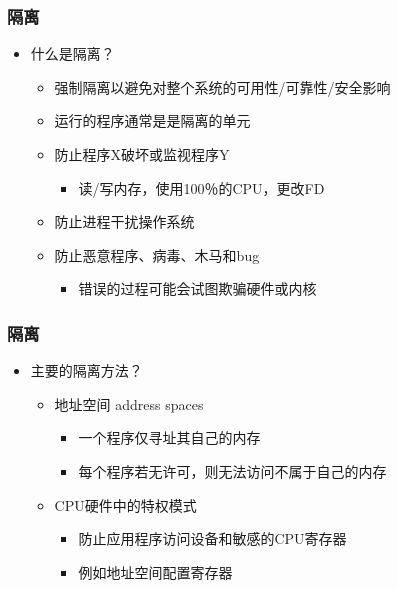 \documentclass[UTF8]{ctexbeamer}
\begin{document}
\begin{frame}
	\frametitle{隔离}
	\begin{itemize}
		\item 什么是隔离？
		\begin{itemize}

		\item 强制隔离以避免对整个系统的可用性/可靠性/安全影响
		\item 运行的程序通常是是隔离的单元
		\item 防止程序X破坏或监视程序Y
			\begin{itemize}
			\item 读/写内存，使用100％的CPU，更改FD
			\end{itemize}
		\item 防止进程干扰操作系统
		\item 防止恶意程序、病毒、木马和bug
			\begin{itemize}
			\item 错误的过程可能会试图欺骗硬件或内核
			\end{itemize}
		\end{itemize}
	\end{itemize}
\end{frame}



\begin{frame}
	\frametitle{隔离}
	\begin{itemize}
		\item 主要的隔离方法？
		\begin{itemize}
			\item 地址空间 address spaces
				\begin{itemize}
				\item 一个程序仅寻址其自己的内存
				\item 每个程序若无许可，则无法访问不属于自己的内存
				\end{itemize}			
			
			\item CPU硬件中的特权模式
				\begin{itemize}
				\item 防止应用程序访问设备和敏感的CPU寄存器
				\item 例如地址空间配置寄存器
				\end{itemize}				
		\end{itemize}
	\end{itemize}
\end{frame}
\end{document}
